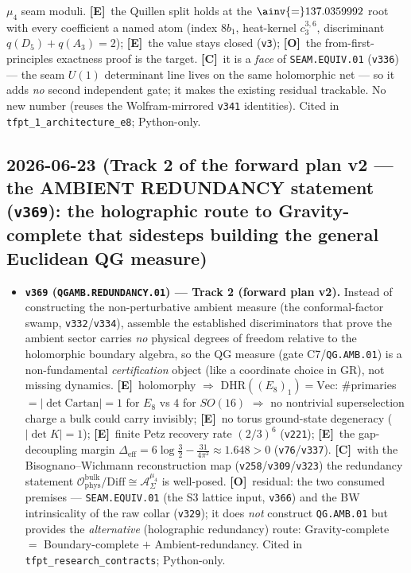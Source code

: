 \documentclass[11pt]{article}
\providecommand{\mE}{\textbf{[E]}}\providecommand{\mC}{\textbf{[C]}}
\providecommand{\mO}{\textbf{[O]}}\providecommand{\mX}{\textbf{[X]}}
\providecommand{\vref}[1]{\texttt{#1}}
\providecommand{\cthree}{c_3}\providecommand{\phiz}{\varphi_0^{\mathrm{ret}}}
\begin{document}
\begin{itemize}
$\mu_4$ seam moduli. \mE\ the Quillen split holds at the $\ainv{=}137.0359992$ root with every coefficient a named
atom (index $8b_1$, heat-kernel $\cthree^{3,6}$, discriminant $q(D_5){+}q(A_3){=}2$); \mE\ the value stays closed
(\vref{v3}); \mO\ the from-first-principles exactness proof is the target. \mC\ it is a \emph{face} of
\texttt{SEAM.EQUIV.01} (\vref{v336}) --- the seam $U(1)$ determinant line lives on the same holomorphic net --- so it
adds \emph{no} second independent gate; it makes the existing residual trackable. No new number (reuses the
Wolfram-mirrored \vref{v341} identities). Cited in \texttt{tfpt\_1\_architecture\_e8}; Python-only.
\end{itemize}

\subsection*{2026-06-23 (Track 2 of the forward plan v2 --- the AMBIENT REDUNDANCY statement (\texttt{v369}): the holographic route to Gravity-complete that sidesteps building the general Euclidean QG measure)}
\begin{itemize}
\item \textbf{\texttt{v369} (\texttt{QGAMB.REDUNDANCY.01}) --- Track 2 (forward plan v2).} Instead of
constructing the non-perturbative ambient measure (the conformal-factor swamp, \vref{v332}/\vref{v334}), assemble
the established discriminators that prove the ambient sector carries \emph{no} physical degrees of freedom relative
to the holomorphic boundary algebra, so the QG measure (gate C7/\texttt{QG.AMB.01}) is a non-fundamental
\emph{certification} object (like a coordinate choice in GR), not missing dynamics. \mE\ holomorphy
$\Rightarrow$ $\mathrm{DHR}((E_8)_1)=\mathrm{Vec}$: $\#$primaries $=|\det\mathrm{Cartan}|=1$ for $E_8$ vs $4$ for
$SO(16)$ $\Rightarrow$ no nontrivial superselection charge a bulk could carry invisibly; \mE\ no torus
ground-state degeneracy ($|\det K|=1$); \mE\ finite Petz recovery rate $(2/3)^6$ (\vref{v221}); \mE\ the
gap-decoupling margin $\Delta_{\mathrm{eff}}=6\log\tfrac32-\tfrac{31}{4\pi^2}\approx1.648>0$ (\vref{v76}/\vref{v337}).
\mC\ with the Bisognano--Wichmann reconstruction map (\vref{v258}/\vref{v309}/\vref{v323}) the redundancy statement
$\mathcal O_{\mathrm{phys}}^{\mathrm{bulk}}/\mathrm{Diff}\cong\mathcal A_\Sigma^{\mu_4}$ is well-posed. \mO\ residual:
the two consumed premises --- \texttt{SEAM.EQUIV.01} (the S3 lattice input, \vref{v366}) and the BW intrinsicality
of the raw collar (\vref{v329}); it does \emph{not} construct \texttt{QG.AMB.01} but provides the
\emph{alternative} (holographic redundancy) route: Gravity-complete $=$ Boundary-complete $+$ Ambient-redundancy.
Cited in \texttt{tfpt\_research\_contracts}; Python-only.
\end{itemize}
\end{document}
